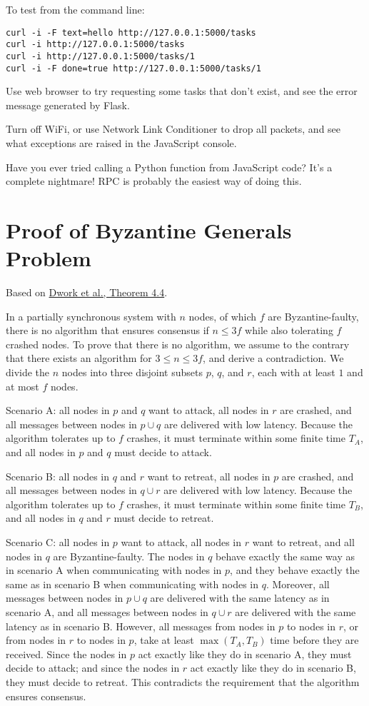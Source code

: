 \documentclass{article}
\begin{document}
To test from the command line:
\begin{verbatim}
curl -i -F text=hello http://127.0.0.1:5000/tasks
curl -i http://127.0.0.1:5000/tasks
curl -i http://127.0.0.1:5000/tasks/1
curl -i -F done=true http://127.0.0.1:5000/tasks/1
\end{verbatim}

Use web browser to try requesting some tasks that don't exist, and see the error message generated by Flask.

Turn off WiFi, or use Network Link Conditioner to drop all packets, and see what exceptions are raised in the JavaScript console.

Have you ever tried calling a Python function from JavaScript code? It's a complete nightmare! RPC is probably the easiest way of doing this.

\section{Proof of Byzantine Generals Problem}

Based on \href{https://groups.csail.mit.edu/tds/papers/Lynch/jacm88.pdf}{Dwork et al., Theorem 4.4}.

In a partially synchronous system with $n$ nodes, of which $f$ are Byzantine-faulty, there is no algorithm that ensures consensus if $n \le 3f$ while also tolerating $f$ crashed nodes.
To prove that there is no algorithm, we assume to the contrary that there exists an algorithm for $3 \le n \le 3f$, and derive a contradiction.
We divide the $n$ nodes into three disjoint subsets $p$, $q$, and $r$, each with at least $1$ and at most $f$ nodes.

Scenario A: all nodes in $p$ and $q$ want to attack, all nodes in $r$ are crashed, and all messages between nodes in $p \cup q$ are delivered with low latency.
Because the algorithm tolerates up to $f$ crashes, it must terminate within some finite time $T_A$, and all nodes in $p$ and $q$ must decide to attack.

Scenario B: all nodes in $q$ and $r$ want to retreat, all nodes in $p$ are crashed, and all messages between nodes in $q \cup r$ are delivered with low latency.
Because the algorithm tolerates up to $f$ crashes, it must terminate within some finite time $T_B$, and all nodes in $q$ and $r$ must decide to retreat.

Scenario C: all nodes in $p$ want to attack, all nodes in $r$ want to retreat, and all nodes in $q$ are Byzantine-faulty.
The nodes in $q$ behave exactly the same way as in scenario A when communicating with nodes in $p$, and they behave exactly the same as in scenario B when communicating with nodes in $q$.
Moreover, all messages between nodes in $p \cup q$ are delivered with the same latency as in scenario A, and all messages between nodes in $q \cup r$ are delivered with the same latency as in scenario B.
However, all messages from nodes in $p$ to nodes in $r$, or from nodes in $r$ to nodes in $p$, take at least $\max(T_A, T_B)$ time before they are received.
Since the nodes in $p$ act exactly like they do in scenario A, they must decide to attack; and since the nodes in $r$ act exactly like they do in scenario B, they must decide to retreat.
This contradicts the requirement that the algorithm ensures consensus.
\end{document}
